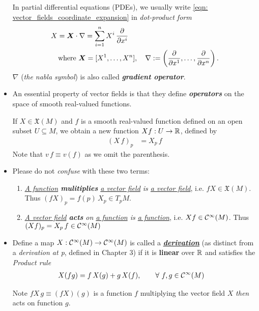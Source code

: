 \documentclass[11pt]{article}
\begin{document}
\begin{itemize}
\begin{remark}
In partial differential equations (PDEs), we usually write \eqref{eqn: vector_fields_coordinate_expansion} in \emph{dot-product form}
\begin{align}
&X = \boldsymbol{X} \cdot \nabla = \sum_{i=1}^{n}X^{i}\,\frac{\partial }{ \partial x^{i}} \label{eqn: vector_fields_coordinate_dot_product}\\
&\quad \text{where }\boldsymbol{X} = [X^{1}, \ldots, X^{n}], \quad \nabla := \left(\frac{\partial }{ \partial x^{1}}, \ldots, \frac{\partial }{ \partial x^{n}}\right).  \nonumber
\end{align} $\nabla$ (\emph{the nabla symbol}) is also called \emph{\textbf{gradient operator}}.
\end{remark}


\item An essential property of vector fields is that they define \emph{\textbf{operators}} on the space of smooth real-valued functions.
\begin{definition}
 If $X \in \mathfrak{X}(M)$ and $f$ is a smooth real-valued function defined on an open subset $U \subseteq M$, we obtain a new function $Xf:  U \rightarrow {\mathbb R}$, defined
by 
\begin{align*}
(X\,f)_{p} &=  X_{p}\,f
\end{align*} Note that $v\,f \equiv v(f)$ as we omit the parenthesis.
\end{definition}

\item \begin{remark} Please do not \emph{confuse} with these two terms:
\begin{enumerate}
\item \emph{\underline{A function} \textbf{mulitiplies} \underline{a vector field}  is \underline{a vector field}}, i.e. $fX \in \mathfrak{X}(M)$. Thus $(fX)_p = f(p)\,X_p \in T_pM$.
\item \emph{\underline{A vector field} \textbf{acts} on \underline{a function} is \underline{a function}}, i.e. $Xf \in {\mathcal C}^{\infty}(M)$. Thus $(Xf)_p = X_p\,f  \in {\mathcal C}^{\infty}(M)$
\end{enumerate}
\end{remark}

\item \begin{definition}
Define a map $X: {\mathcal C}^{\infty}(M) \rightarrow {\mathcal C}^{\infty}(M)$ is called a \underline{\emph{\textbf{derivation}}} (as distinct from a \emph{derivation at p}, defined in Chapter 3) if it is \textbf{linear} over ${\mathbb R}$ and satisfies the \emph{Product rule}
\begin{align}
X(fg) &= f\, X(g) + g\, X(f),  \qquad \forall\,\, f,g \in {\mathcal C}^{\infty}(M) \label{eqn: derivation_vector_fields}
\end{align}
\end{definition} Note $fX\,g \equiv (fX)(g)$ is a function $f$ multiplying the vector field $X$ \emph{then} acts on function $g$.


\end{itemize}
\end{document}
